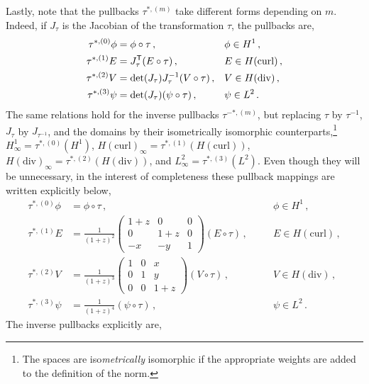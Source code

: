 Lastly, note that the pullbacks $\tau^{*,(m)}$ take different forms depending on $m$.
Indeed, if $J_\tau$ is the Jacobian of the transformation $\tau$, the pullbacks are,
\begin{equation}
\begin{alignedat}{3}
	\tau^{*,(0)}\phi&=\phi\circ\tau\,,\quad&&\phi\in H^1\,,\\
	\tau^{*,(1)}E&=J_\tau^{\mathsf{T}}(E\circ\tau)\,,\quad && E\in H(\mathrm{curl})\,,\\
	\tau^{*,(2)}V&=\det(J_\tau)J_\tau^{-1}(V\circ\tau)\,,\quad && V\in H(\mathrm{div})\,,\\
	\tau^{*,(3)}\psi&=\det(J_\tau)(\psi\circ\tau)\,,\quad && \psi\in L^2\,.
\end{alignedat}
\label{eq:pullbacksgeneral}
\end{equation}
The same relations hold for the inverse pullbacks $\tau^{-*,(m)}$, but replacing $\tau$ by $\tau^{-1}$, $J_\tau$ by $J_{\tau^{-1}}$, and the domains by their isometrically isomorphic counterparts,\footnote{The spaces are iso\textit{metrically} isomorphic if the appropriate weights are added to the definition of the norm.} $H_\infty^1=\tau^{*,(0)}(H^1)$, $H(\mathrm{curl})_\infty=\tau^{*,(1)}(H(\mathrm{curl}))$, $H(\mathrm{div})_\infty=\tau^{*,(2)}(H(\mathrm{div}))$, and $L_\infty^2=\tau^{*,(3)}(L^2)$.
Even though they will be unnecessary, in the interest of completeness these pullback mappings are written explicitly below,
\begin{equation}
\begin{alignedat}{3}
	\tau^{*,(0)}\phi&=\phi\circ\tau\,,\quad
		&&\phi\in H^1\,,\\
	\tau^{*,(1)}E&=\frac{1}{(1+z)^2}\begin{pmatrix}1+z&0&0\\0&1+z&0\\-x&-y&1\end{pmatrix}(E\circ\tau)\,,\quad
		&& E\in H(\mathrm{curl})\,,\\
	\tau^{*,(2)}V&=\frac{1}{(1+z)^3}\begin{pmatrix}1&0&x\\0&1&y\\0&0&1+z\end{pmatrix}(V\circ\tau)\,,\quad
		&& V\in H(\mathrm{div})\,,\\
	\tau^{*,(3)}\psi&=\frac{1}{(1+z)^4}(\psi\circ\tau)\,,\quad
		&&\psi\in L^2\,.
\end{alignedat}
\label{eq:Pyramidpullbacks}
\end{equation}
The inverse pullbacks explicitly are,
